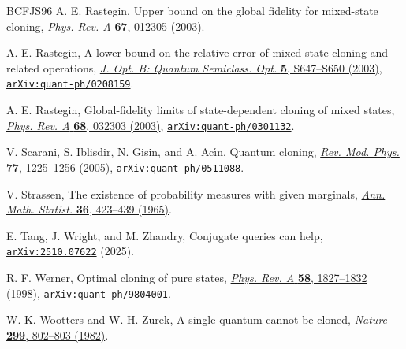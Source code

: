 \documentclass[11pt]{article}
\theoremstyle{remark}
\theoremstyle{plain}
\newcommand{\doi}[2]{\href{https://doi.org/#1}{#2}}
\newcommand{\arxiv}[1]{\href{https://arxiv.org/abs/#1}{\texttt{arXiv:#1}}}
\begin{document}
\begin{thebibliography}{BCFJS96}
A. E. Rastegin,
Upper bound on the global fidelity for mixed-state cloning,
\doi{10.1103/PhysRevA.67.012305}{\emph{Phys. Rev. A} \textbf{67}, 012305 (2003)}.

A. E. Rastegin,
A lower bound on the relative error of mixed-state cloning and related operations,
\doi{10.1088/1464-4266/5/6/017}{\emph{J. Opt. B: Quantum Semiclass. Opt.}
\textbf{5}, S647--S650 (2003)},
\arxiv{quant-ph/0208159}.

A. E. Rastegin,
Global-fidelity limits of state-dependent cloning of mixed states,
\doi{10.1103/PhysRevA.68.032303}{\emph{Phys. Rev. A} \textbf{68}, 032303 (2003)},
\arxiv{quant-ph/0301132}.

V. Scarani, S. Iblisdir, N. Gisin, and A. Ac\'{\i}n,
Quantum cloning,
\doi{10.1103/RevModPhys.77.1225}{\emph{Rev. Mod. Phys.} \textbf{77}, 1225--1256 (2005)},
\arxiv{quant-ph/0511088}.

V. Strassen,
The existence of probability measures with given marginals,
\doi{10.1214/aoms/1177700153}{\emph{Ann. Math. Statist.} \textbf{36},
423--439 (1965)}.

E. Tang, J. Wright, and M. Zhandry,
Conjugate queries can help,
\arxiv{2510.07622} (2025).

R. F. Werner,
Optimal cloning of pure states,
\doi{10.1103/PhysRevA.58.1827}{\emph{Phys. Rev. A} \textbf{58}, 1827--1832 (1998)},
\arxiv{quant-ph/9804001}.

W. K. Wootters and W. H. Zurek,
A single quantum cannot be cloned,
\doi{10.1038/299802a0}{\emph{Nature} \textbf{299}, 802--803 (1982)}.


\end{thebibliography}
\end{document}
